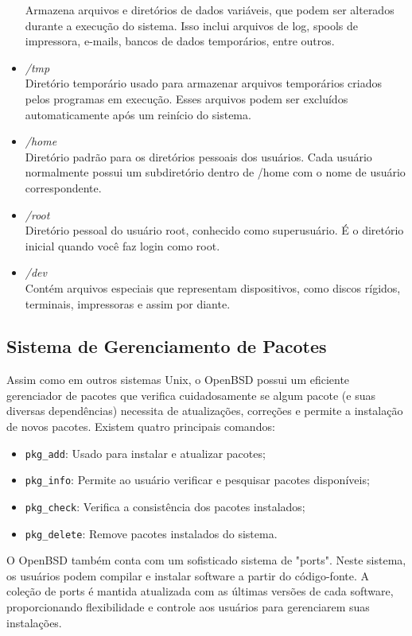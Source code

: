 \documentclass[a4paper,10pt]{article}
\begin{document}
\begin{itemize}
    Armazena arquivos e diretórios de dados variáveis, que podem ser alterados durante a execução do sistema. Isso inclui arquivos de log, spools de impressora, e-mails, bancos de dados temporários, entre outros.
    \item \textit{/tmp} \\
    Diretório temporário usado para armazenar arquivos temporários criados pelos programas em execução. Esses arquivos podem ser excluídos automaticamente após um reinício do sistema.
    \item \textit{/home} \\
    Diretório padrão para os diretórios pessoais dos usuários. Cada usuário normalmente possui um subdiretório dentro de /home com o nome de usuário correspondente.
    \item \textit{/root} \\
    Diretório pessoal do usuário root, conhecido como superusuário. É o diretório inicial quando você faz login como root.
    \item \textit{/dev} \\
    Contém arquivos especiais que representam dispositivos, como discos rígidos, terminais,   impressoras e assim por diante.
\end{itemize}

\subsection{Sistema de Gerenciamento de Pacotes}

Assim como em outros sistemas Unix, o OpenBSD possui um eficiente gerenciador de pacotes que verifica cuidadosamente se algum pacote (e suas diversas dependências) necessita de atualizações, correções e permite a instalação de novos pacotes. Existem quatro principais comandos:

\begin{itemize}
\item \verb|pkg_add|: Usado para instalar e atualizar pacotes;
\item \verb|pkg_info|: Permite ao usuário verificar e pesquisar pacotes disponíveis;
\item \verb|pkg_check|: Verifica a consistência dos pacotes instalados;
\item \verb|pkg_delete|: Remove pacotes instalados do sistema.
\end{itemize}

O OpenBSD também conta com um sofisticado sistema de "ports". Neste sistema, os usuários podem compilar e instalar software a partir do código-fonte. A coleção de ports é mantida atualizada com as últimas versões de cada software, proporcionando flexibilidade e controle aos usuários para gerenciarem suas instalações.
\end{document}
